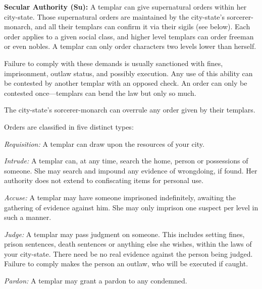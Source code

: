 
\textbf{Secular Authority (Su):} A templar can give supernatural orders within her city-state. Those supernatural orders are maintained by the city-state's sorcerer-monarch, and all their templars can confirm it via their sigils (see below). Each order applies to a given social class, and higher level templars can order freeman or even nobles. A templar can only order characters two levels lower than herself.

Failure to comply with these demands is usually sanctioned with fines, imprisonment, outlaw status, and possibly execution. Any use of this ability can be contested by another templar with an opposed  check. An order can only be contested once---templars can bend the law but only so much.

The city-state's sorcerer-monarch can overrule any order given by their templars.

Orders are classified in five distinct types:
\begin{itemize*}
\item \textit{Requisition:} A templar can draw upon the resources of your city.
\item \textit{Intrude:} A templar can, at any time, search the home, person or possessions of someone. She may search and impound any evidence of wrongdoing, if found. Her authority does not extend to confiscating items for personal use.
\item \textit{Accuse:} A templar may have someone imprisoned indefinitely, awaiting the gathering of evidence against him. She may only imprison one suspect per level in such a manner.
\item \textit{Judge:} A templar may pass judgment on someone. This includes setting fines, prison sentences, death sentences or anything else she wishes, within the laws of your city-state. There need be no real evidence against the person being judged. Failure to comply makes the person an outlaw, who will be executed if caught.
\item \textit{Pardon:} A templar may grant a pardon to any condemned.
\end{itemize*}

